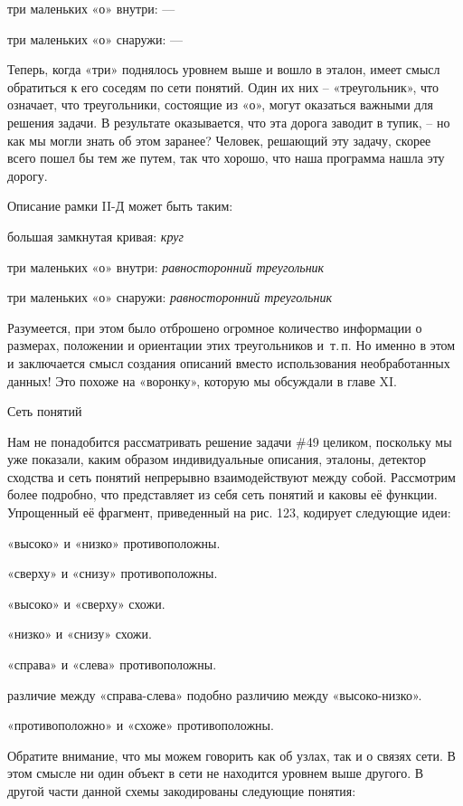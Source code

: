 \documentclass[../main.tex]{subfiles}
\begin{document}
три маленьких «о» внутри: ---

три маленьких «о» снаружи: ---

Теперь, когда «три» поднялось уровнем выше и вошло в эталон, имеет смысл обратиться к его соседям по сети понятий. Один их них \--- «треугольник», что означает, что треугольники, состоящие из «о», могут оказаться важными для решения задачи. В результате оказывается, что эта дорога заводит в тупик, \--- но как мы могли знать об этом заранее? Человек, решающий эту задачу, скорее всего пошел бы тем же путем, так что хорошо, что наша программа нашла эту дорогу.

Описание рамки II-Д может быть таким:

большая замкнутая кривая: \emph{круг}

три маленьких «о» внутри: \emph{равносторонний треугольник}

три маленьких «о» снаружи: \emph{равносторонний треугольник}

Разумеется, при этом было отброшено огромное количество информации о размерах, положении и ориентации этих треугольников и~т.\,п. Но именно в этом и заключается смысл создания описаний вместо использования необработанных данных! Это похоже на «воронку», которую мы обсуждали в главе XI.

Сеть понятий

Нам не понадобится рассматривать решение задачи \#49 целиком, поскольку мы уже показали, каким образом индивидуальные описания, эталоны, детектор сходства и сеть понятий непрерывно взаимодействуют между собой. Рассмотрим более подробно, что представляет из себя сеть понятий и каковы её функции. Упрощенный её фрагмент, приведенный на рис. 123, кодирует следующие идеи:

«высоко» и «низко» противоположны.

«сверху» и «снизу» противоположны.

«высоко» и «сверху» схожи.

«низко» и «снизу» схожи.

«справа» и «слева» противоположны.

различие между «справа-слева» подобно различию между «высоко-низко».

«противоположно» и «схоже» противоположны.

Обратите внимание, что мы можем говорить как об узлах, так и о связях сети. В этом смысле ни один объект в сети не находится уровнем выше другого. В другой части данной схемы закодированы следующие понятия:
\end{document}
